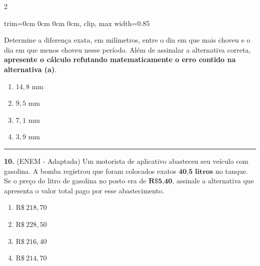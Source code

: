 \documentclass[twoside, 10pt, a4paper]{article}
\newlength{\espacoPreQuestao}\setlength{\espacoPreQuestao}{0.1cm}
\newlength{\espacoQuestao}\setlength{\espacoQuestao}{0.2cm}
\newcommand{\larguraTikz}{0.85\linewidth}
\begin{document}
\begin{multicols*}{2}
\begin{center}
\begin{adjustbox}{trim=0cm 0cm 0cm 0cm, clip, max width=\larguraTikz}
\end{adjustbox}
\end{center}
Determine a diferença exata, em milímetros, entre o dia em que mais choveu e o dia em que menos choveu nesse período. Além de assinalar a alternativa correta, \textbf{apresente o cálculo refutando matematicamente o erro contido na alternativa (a)}.
\begin{enumerate}[label=\alph*)]
    \item $ 14,8 \text{ mm} $
    \item $ 9,5 \text{ mm} $
    \item $ 7,1 \text{ mm} $
    \item $ 3,9 \text{ mm} $
\end{enumerate}
\par\vspace{\espacoQuestao}

\noindent\textcolor{CorLinha}{\rule{\linewidth}{0.5pt}} 
\par\vspace{\espacoPreQuestao}
\textbf{10.} (ENEM - Adaptada) Um motorista de aplicativo abasteceu seu veículo com gasolina. A bomba registrou que foram colocados exatos $ \textbf{40,5 litros} $ no tanque. Se o preço do litro de gasolina no posto era de $ \textbf{R\$ 5,40} $, assinale a alternativa que apresenta o valor total pago por esse abastecimento.
\begin{enumerate}[label=\alph*)]
    \item $ \text{R\$} \ 218,70 $
    \item $ \text{R\$} \ 228,50 $
    \item $ \text{R\$} \ 216,40 $
    \item $ \text{R\$} \ 214,70 $
\end{enumerate}
\par\vspace{\espacoQuestao}


\end{multicols*}
\end{document}
